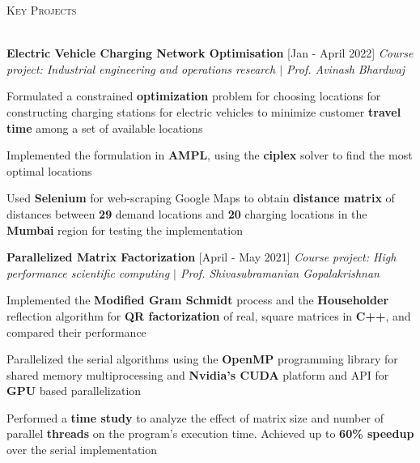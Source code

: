 \documentclass[12pt]{article}
\renewcommand{\section}[1]{
    \vspace*{10pt}
    \textsc{\Large{#1}}
    \vspace*{-10pt} \\ \hspace*{-5pt} 
    \hrulefill \\
    \vspace*{-15pt}
}
\newcommand{\smallbullet}{
    \small$\bullet$
}
\newcommand{\bigblock}[3]{
    {
        \hspace*{-8pt} \textbf{#1} \hfill #2 \newline
        \textit{#3}
    }
}
\newenvironment{bullet-list-minor}{
    \begin{list}{
        \smallbullet
    }{
        \setlength\leftmargin{30pt}\topsep 0pt \itemsep -3pt
    }
} {
    \end{list}
}
\begin{document}

    \section{Key Projects}

    \bigblock{
        Electric Vehicle Charging Network Optimisation
    }{
        [Jan - April 2022]
    }{
        Course project: Industrial engineering and operations research \(|\) Prof. Avinash Bhardwaj
    }
	\begin{bullet-list-minor}
        \item Formulated a constrained \textbf{optimization} problem for choosing locations for constructing
        charging stations for electric vehicles to minimize customer \textbf{travel time} among a set of
        available locations
        \item Implemented the formulation in \textbf{AMPL}, using the \textbf{ciplex} solver to find the most
        optimal locations
        \item Used \textbf{Selenium} for web-scraping Google Maps to obtain \textbf{distance matrix} of distances
        between \textbf{29} demand locations and \textbf{20} charging locations in the \textbf{Mumbai} region for
        testing the implementation
    \end{bullet-list-minor}

    \bigblock{
        Parallelized Matrix Factorization
    }{
        [April - May 2021]
    }{
        Course project: High performance scientific computing \(|\) Prof. Shivasubramanian Gopalakrishnan
    }
	\begin{bullet-list-minor}
        \item Implemented the \textbf{Modified Gram Schmidt} process and the \textbf{Householder} reflection algorithm for
        \textbf{QR factorization} of real, square matrices in \textbf{C++}, and compared their performance
        \item Parallelized the serial algorithms using the \textbf{OpenMP} programming library for shared memory
        multiprocessing and \textbf{Nvidia's CUDA} platform and API for \textbf{GPU} based parallelization
        \item Performed a \textbf{time study} to analyze the effect of matrix size and number of parallel \textbf{threads} on
        the program's execution time. Achieved up to \textbf{60\% speedup} over the serial implementation
    \end{bullet-list-minor}
\end{document}
